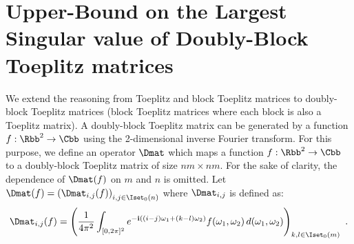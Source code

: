 %
%

\section{Upper-Bound on the Largest Singular value of Doubly-Block Toeplitz matrices}
\label{section:ch5-bound_on_the_singular_value_of_doubly-block_toeplitz_matrices}

We extend the reasoning from Toeplitz and block Toeplitz matrices to doubly-block Toeplitz matrices (\ie block Toeplitz matrices where each block is also a Toeplitz matrix).
A doubly-block Toeplitz matrix can be generated by a function $f: \Rbb^2 \rightarrow \Cbb$ using the 2-dimensional inverse Fourier transform.
For this purpose, we define an operator $\Dmat$ which maps a function $f: \Rbb^2 \rightarrow \Cbb$ to a doubly-block Toeplitz matrix of size $nm \times nm$.
For the sake of clarity, the dependence of $\Dmat(f)$  on $m$ and $n$ is omitted.
Let $\Dmat(f) = \leftmat \Dmat_{i,j}(f)\rightmat_{i,j \in \Iset_0(n)}$ where $\Dmat_{i,j}$ is defined as:
\begin{equation} \label{equation:doubly_block_toeplitz_operator}
  \Dmat_{i,j}(f) = \leftmat \frac{1}{4\pi^{2}} \int_{[0,2\pi]^{2}} e^{- \ci \left((i-j)\omega_{1}+(k-l)\omega_{2}\right)}f(\omega_{1},\omega_{2})\,d(\omega_{1},\omega_{2}) \rightmat_{k,l \in \Iset_0(m)} \enspace.
\end{equation}

